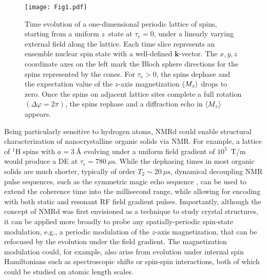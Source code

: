 \documentclass[9pt,twocolumn,twoside,lineno]{pnas-new}
\begin{document}
\begin{figure}[th]
    \centering
    \texttt{[image: Fig1.pdf]}
    \caption{Time evolution of a one-dimensional periodic lattice of spins, starting from a uniform $z$~state at $\tau_e=0$, under a linearly varying external field along the lattice. Each time slice represents an ensemble nuclear spin state with a well-defined $\mathbf{k}$-vector. The $x, y, z$ coordinate axes on the left mark the Bloch sphere directions for the spins represented by the cones. For $\tau_e>0$, the spins dephase and the expectation value of the $z$-axis magnetization $\expval{M_z}$ drops to zero. Once the spins on adjacent lattice sites complete a full rotation $(\Delta\varphi=2\pi)$, the spins rephase and a diffraction echo in $\expval{M_z}$ appears.}
    \label{fig:Fig1}
\end{figure}

Being particularly sensitive to hydrogen atoms, NMRd could enable structural characterization of nanocrystalline organic solids via NMR. For example, a lattice of $^1$H spins with $a=3~\text{\AA}$ evolving under a uniform field gradient of $10^5$~T/m would produce a DE at $\tau_e=780~\mu\text{s}$. While the dephasing times in most organic solids are much shorter, typically of order $T_2\sim 20~\mu\text{s}$, dynamical decoupling NMR pulse sequences, such as the symmetric magic echo sequence \cite{Boutis2003}, can be used to extend the coherence time into the millisecond range, while allowing for encoding with both static and resonant RF field gradient pulses.
Importantly, although the concept of NMRd was first envisioned as a technique to study crystal structures, it can be applied more broadly to probe any spatially-periodic spin-state modulation, e.g., a periodic modulation of the $z$-axis magnetization, that can be refocused by the evolution under the field gradient.
The magnetization modulation could, for example, also arise from evolution under internal spin Hamiltonians such as spectroscopic shifts or spin-spin interactions, both of which could be studied on atomic length scales.
\end{document}
